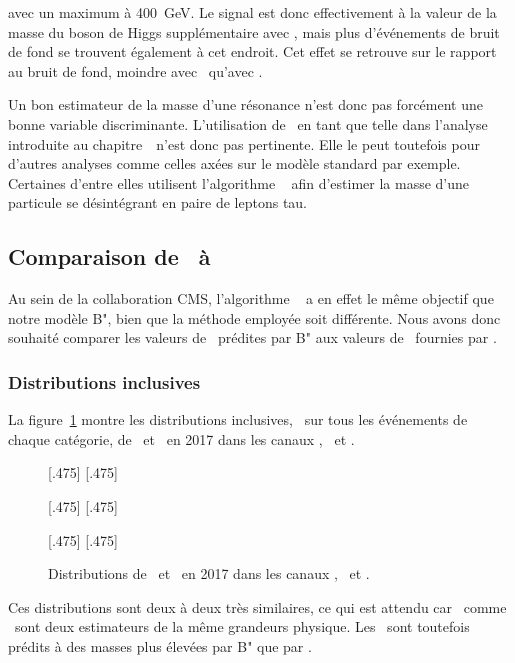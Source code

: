 avec un maximum à \SI{400}{\GeV}.
Le signal est donc effectivement à la valeur de la masse du boson de Higgs supplémentaire avec \mml,
mais plus d'événements de bruit de fond se trouvent également à cet endroit.
Cet effet se retrouve sur le rapport au bruit de fond, moindre avec \mml\ qu'avec \mTtot.
\par
Un bon estimateur de la masse d'une résonance n'est donc pas forcément une bonne variable discriminante.
L'utilisation de \mml\ en tant que telle dans l'analyse introduite au chapitre~\ n'est donc pas pertinente.
Elle le peut toutefois pour d'autres analyses comme celles axées sur le modèle standard par exemple.
Certaines d'entre elles utilisent l'algorithme \SVFIT~\cite{SVFit_Bianchini_2014} afin d'estimer
la masse d'une particule se désintégrant en paire de leptons tau.
\subsection{Comparaison de \mml\ à \msv}
Au sein de la collaboration CMS, l'algorithme \SVFIT~\cite{SVFit_Bianchini_2014} a en effet le même objectif que notre modèle B",
bien que la méthode employée soit différente.
Nous avons donc souhaité comparer
les valeurs de \mml\ prédites par B"
aux valeurs de \msv\ fournies par \SVFIT.
\subsubsection{Distributions inclusives}
La figure~\ref{fig-svfit_vs_ml_2017}
montre les distributions inclusives, \ie\ sur tous les événements de chaque catégorie, de \msv\ et \mml\ en 2017 dans les canaux \tauh\tauh, \ele\tauh\ et \ele\mu.
\begin{figure}[p]
\centering

[.475\textwidth]
{}
\hfill
{}[.475\textwidth]
{}

[.475\textwidth]
{}
\hfill
{}[.475\textwidth]
{}

[.475\textwidth]
{}
\hfill
{}[.475\textwidth]
{}

\caption{Distributions de \msv\ et \mml\ en 2017 dans les canaux \tauh\tauh, \ele\tauh\ et \ele\mu.}
\label{fig-svfit_vs_ml_2017}
\end{figure}
Ces distributions sont deux à deux très similaires,
ce qui est attendu car \msv\ comme \mml\ sont deux estimateurs de la même grandeurs physique.
Les \ftauhs\ sont toutefois prédits à des masses plus élevées par B" que par \SVFIT.
